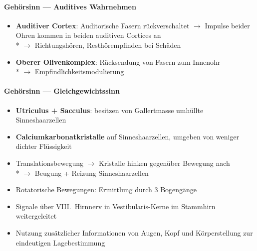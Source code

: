 \paragraph{Gehörsinn --- Auditives Wahrnehmen}
\begin{itemize}
  \item \textbf{Auditiver Cortex}: Auditorische Fasern rückverschaltet \( \to \) Impulse beider Ohren kommen in beiden auditiven Cortices an \\* \( \to \) Richtungshören, Resthörempfinden bei Schäden
  \item \textbf{Oberer Olivenkomplex}: Rücksendung von Fasern zum Innenohr \\* \( \to \) Empfindlichkeitsmodulierung
\end{itemize}

\paragraph{Gehörsinn --- Gleichgewichtssinn}
\begin{itemize}
  \item \textbf{Utriculus + Sacculus}: besitzen von Gallertmasse umhüllte Sinneshaarzellen
  \item \textbf{Calciumkarbonatkristalle} auf Sinneshaarzellen, umgeben von weniger dichter Flüssigkeit
  \item Translationsbewegung \( \to \) Kristalle hinken gegenüber Bewegung nach \\* \( \to \) Beugung + Reizung Sinneshaarzellen
  \item Rotatorische Bewegungen: Ermittlung durch 3 Bogengänge
  \item Signale über VIII.\ Hirnnerv in Vestibularis-Kerne im Stammhirn weitergeleitet
  \item Nutzung zusätzlicher Informationen von Augen, Kopf und Körperstellung zur eindeutigen Lagebestimmung
\end{itemize}